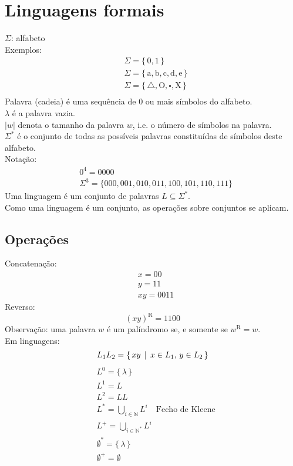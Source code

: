 \documentclass[11pt]{article}
\date{\today}
\title{}
\begin{document}
\section{Linguagens formais}
\label{sec:org4bee8ec}
\(\Sigma\): alfabeto \\
Exemplos:
\begin{align*}
  & \Sigma = \{\, 0, 1 \,\} \\
  & \Sigma = \{\, \text{a}, \text{b}, \text{c}, \text{d}, \text{e} \,\} \\
  & \Sigma = \{\, \triangle, \text{O}, \square, \text{X} \,\} \\
\end{align*}
Palavra (cadeia) é uma sequência de \(0\) ou mais símbolos do alfabeto. \\
\(\lambda\) é a palavra vazia. \\
\(|w|\) denota o tamanho da palavra \(w\), i.e. o número de símbolos na palavra. \\
\(\Sigma^*\) é o conjunto de todas as possíveis palavras constituídas de símbolos
deste alfabeto. \\
Notação:
\begin{align*}
  & 0^4 = 0000 \\
  & \Sigma^3 = \{ 000, 001, 010, 011, 100, 101, 110, 111 \}
\end{align*}
Uma linguagem é um conjunto de palavras \(L \subseteq \Sigma^*\). \\
Como uma linguagem é um conjunto, as operações sobre conjuntos se aplicam. \\
\subsection{Operações}
\label{sec:orgc8ad2f0}
Concatenação:
\begin{align*}
  & x = 00 \\
  & y = 11 \\
  & xy = 0011
\end{align*}
Reverso:
\[
  (xy)^{\text{R}} = 1100
\]
Observação: uma palavra \(w\) é um palíndromo se, e somente se \(w^{\text{R}} = w\). \\
Em linguagens:
\[ L_1L_2 = \{\, xy \,\mid\, x \in L_1,\, y \in L_2 \,\} \\ \]
\begin{align*}
  & L^0 = \{\, \lambda \,\} \\
  & L^1 = L \\
  & L^2 = LL \\
  & L^* = \bigcup_{i \in \mathbb{N}} L^i \quad \text{Fecho de Kleene} \\
  & L^+ = \bigcup_{i \in \mathbb{N}^*} L^i \\
  & \emptyset^* = \{\, \lambda \,\} \\
  & \emptyset^+ = \emptyset
\end{align*}
\end{document}
